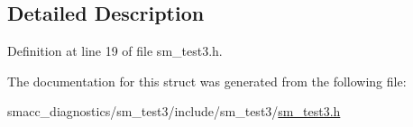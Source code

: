 \subsection{Detailed Description}


Definition at line 19 of file sm\+\_\+test3.\+h.



The documentation for this struct was generated from the following file\+:\begin{DoxyCompactItemize}
\item 
smacc\+\_\+diagnostics/sm\+\_\+test3/include/sm\+\_\+test3/\hyperlink{sm__test3_8h}{sm\+\_\+test3.\+h}\end{DoxyCompactItemize}
